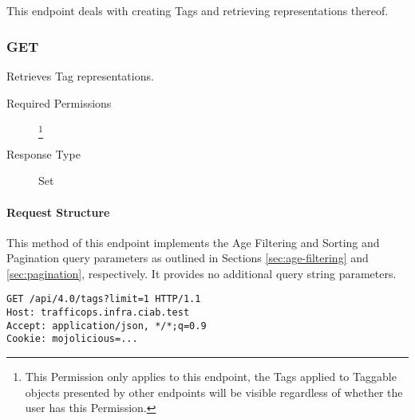 %
%

\subsection{}
This endpoint deals with creating Tags and retrieving representations thereof.

\subsubsection{GET}
Retrieves Tag representations.
\begin{description}
	\item[Required Permissions] \footnote{This Permission only
	applies to this endpoint, the Tags applied to Taggable objects presented by
	other endpoints will be visible regardless of whether the user has this
	Permission.}
	\item[Response Type] Set
\end{description}

\paragraph{Request Structure}
This method of this endpoint implements the Age Filtering and Sorting and
Pagination query parameters as outlined in Sections \ref{sec:age-filtering} and
\ref{sec:pagination}, respectively. It provides no additional query string
parameters.

\begin{codelisting}
\begin{verbatim}
GET /api/4.0/tags?limit=1 HTTP/1.1
Host: trafficops.infra.ciab.test
Accept: application/json, */*;q=0.9
Cookie: mojolicious=...

\end{verbatim}
\end{codelisting}

